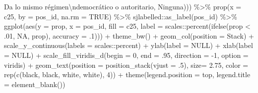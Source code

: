 \documentclass[
  12pt,
]{book}
\newenvironment{Shaded}{\begin{snugshade}}{\end{snugshade}}
\newcommand{\AttributeTok}[1]{\textcolor[rgb]{0.77,0.63,0.00}{#1}}
\newcommand{\ConstantTok}[1]{\textcolor[rgb]{0.00,0.00,0.00}{#1}}
\newcommand{\DecValTok}[1]{\textcolor[rgb]{0.00,0.00,0.81}{#1}}
\newcommand{\FloatTok}[1]{\textcolor[rgb]{0.00,0.00,0.81}{#1}}
\newcommand{\FunctionTok}[1]{\textcolor[rgb]{0.00,0.00,0.00}{#1}}
\newcommand{\NormalTok}[1]{#1}
\newcommand{\SpecialCharTok}[1]{\textcolor[rgb]{0.00,0.00,0.00}{#1}}
\newcommand{\StringTok}[1]{\textcolor[rgb]{0.31,0.60,0.02}{#1}}
\begin{document}
\begin{Shaded}
\begin{Highlighting}[]
                                 \StringTok{\textquotesingle{}Da lo mismo régimen}\SpecialCharTok{\textbackslash{}n}\StringTok{democrático o autoritario\textquotesingle{}}\NormalTok{, }
                                 \StringTok{\textquotesingle{}Ninguna\textquotesingle{}}\NormalTok{))) }\SpecialCharTok{\%\textgreater{}\%}
  \FunctionTok{prop}\NormalTok{(}\AttributeTok{x =}\NormalTok{ c25, }\AttributeTok{by =}\NormalTok{ pos\_id, }\AttributeTok{na.rm =} \ConstantTok{TRUE}\NormalTok{) }\SpecialCharTok{\%\textgreater{}\%} 
\NormalTok{  sjlabelled}\SpecialCharTok{::}\FunctionTok{as\_label}\NormalTok{(pos\_id) }\SpecialCharTok{\%\textgreater{}\%} 
  \FunctionTok{ggplot}\NormalTok{(}\FunctionTok{aes}\NormalTok{(}\AttributeTok{y =}\NormalTok{ prop, }\AttributeTok{x =}\NormalTok{ pos\_id, }\AttributeTok{fill =}\NormalTok{ c25, }
             \AttributeTok{label =}\NormalTok{ scales}\SpecialCharTok{::}\FunctionTok{percent}\NormalTok{(}\FunctionTok{ifelse}\NormalTok{(prop }\SpecialCharTok{\textless{}}\NormalTok{ .}\DecValTok{01}\NormalTok{, }\ConstantTok{NA}\NormalTok{, prop), }\AttributeTok{accuracy =}\NormalTok{ .}\DecValTok{1}\NormalTok{))) }\SpecialCharTok{+} 
  \FunctionTok{theme\_bw}\NormalTok{() }\SpecialCharTok{+} 
  \FunctionTok{geom\_col}\NormalTok{(}\AttributeTok{position =} \StringTok{\textquotesingle{}Stack\textquotesingle{}}\NormalTok{) }\SpecialCharTok{+}
  \FunctionTok{scale\_y\_continuous}\NormalTok{(}\AttributeTok{labels =}\NormalTok{ scales}\SpecialCharTok{::}\NormalTok{percent) }\SpecialCharTok{+}
  \FunctionTok{ylab}\NormalTok{(}\AttributeTok{label =} \ConstantTok{NULL}\NormalTok{) }\SpecialCharTok{+}
  \FunctionTok{xlab}\NormalTok{(}\AttributeTok{label =} \ConstantTok{NULL}\NormalTok{) }\SpecialCharTok{+}
  \FunctionTok{scale\_fill\_viridis\_d}\NormalTok{(}\AttributeTok{begin =} \DecValTok{0}\NormalTok{, }\AttributeTok{end =}\NormalTok{ .}\DecValTok{95}\NormalTok{, }\AttributeTok{direction =} \SpecialCharTok{{-}}\DecValTok{1}\NormalTok{, }\AttributeTok{option =} \StringTok{\textquotesingle{}viridis\textquotesingle{}}\NormalTok{) }\SpecialCharTok{+}
  \FunctionTok{geom\_text}\NormalTok{(}\AttributeTok{position =} \FunctionTok{position\_stack}\NormalTok{(}\AttributeTok{vjust =}\NormalTok{ .}\DecValTok{5}\NormalTok{),}
            \AttributeTok{size=} \FloatTok{2.75}\NormalTok{,}
            \AttributeTok{color =} \FunctionTok{rep}\NormalTok{(}\FunctionTok{c}\NormalTok{(}\StringTok{\textquotesingle{}black\textquotesingle{}}\NormalTok{, }\StringTok{\textquotesingle{}black\textquotesingle{}}\NormalTok{, }\StringTok{\textquotesingle{}white\textquotesingle{}}\NormalTok{, }\StringTok{\textquotesingle{}white\textquotesingle{}}\NormalTok{), }\DecValTok{4}\NormalTok{)) }\SpecialCharTok{+} 
  \FunctionTok{theme}\NormalTok{(}\AttributeTok{legend.position =} \StringTok{\textquotesingle{}top\textquotesingle{}}\NormalTok{,}
        \AttributeTok{legend.title =} \FunctionTok{element\_blank}\NormalTok{())}
\end{Highlighting}
\end{Shaded}
\end{document}
